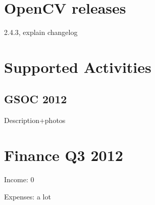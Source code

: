 \documentclass[a4paper,10pt]{article}
\begin{document}
\section*{OpenCV releases}
2.4.3, explain changelog
 
\section*{Supported Activities}

\subsection*{GSOC 2012}

Description+photos

\section*{Finance Q3 2012}

Income: 0

Expenses: a lot
\end{document}
